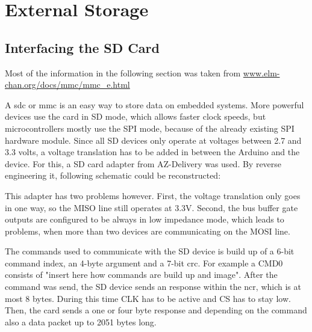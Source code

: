 \setchapterpreamble[u]{\margintoc}

\chapter{External Storage}

\section{Interfacing the SD Card}
\label{sec:interfacing-the-sd-card}

Most of the information in the following section was taken from \href{http://www.elm-chan.org/docs/mmc/mmc_e.html}{www.elm-chan.org/docs/mmc/mmc\_e.html}

A \gls{sdc} or \gls{mmc} is an easy way to store data on embedded systems. More powerful devices use the card in SD mode, which allows faster clock speeds, but microcontrollers mostly use the SPI mode, because of the already existing SPI hardware module. Since all SD devices only operate at voltages between 2.7 and 3.3 volts, a voltage translation has to be added in between the Arduino and the device. For this, a SD card adapter from AZ-Delivery was used. By reverse engineering it, following schematic could be reconstructed:


This adapter has two problems however. First, the voltage translation only goes in one way, so the MISO line still operates at 3.3V. Second, the bus buffer gate outputs are configured to be always in low impedance mode, which leads to problems, when more than two devices are communicating on the MOSI line.

The commands used to communicate with the SD device is build up of a 6-bit command index, an 4-byte argument and a 7-bit \gls{crc}. For example a CMD0 consists of "insert here how commands are build up and image". After the command was send, the SD device sends an response within the \gls{ncr}, which is at most 8 bytes. During this time CLK has to be active and CS has to stay low. Then, the card sends a one or four byte response and depending on the command also a data packet up to 2051 bytes long.

